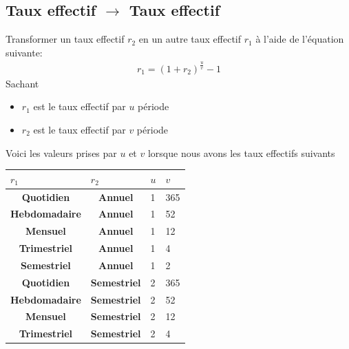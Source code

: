 \documentclass[12pt]{article}
\begin{document}
\subsection{Taux effectif $\rightarrow$ Taux effectif}

Transformer un taux effectif $r_2$ en un autre taux effectif $r_1$ à l'aide de l'équation suivante:
\begin{align*}
r_1 =(1+r_2)^{\frac{u}{v}}-1
\end{align*}
Sachant 
\begin{itemize}
\item $r_1$ est le taux effectif par $u$ période 
\item $r_2$ est le taux effectif par $v$ période 
\end{itemize}
Voici les valeurs prises par $u$ et $v$ lorsque nous avons les taux effectifs suivants 


\begin{table}[H]
\begin{center}
\begin{tabular}{|c|c|l|l|}
\hline
\multicolumn{1}{|l|}{\textbf{$r_1$}} & \multicolumn{1}{l|}{\textbf{$r_2$}} & \textbf{$u$} & \textbf{$v$} \\ \hline
\textbf{Quotidien}                   & \textbf{Annuel}                     & 1            & 365          \\ \hline
\textbf{Hebdomadaire}                & \textbf{Annuel}                     & 1            & 52           \\ \hline
\textbf{Mensuel}                     & \textbf{Annuel}                     & 1            & 12           \\ \hline
\textbf{Trimestriel}                 & \textbf{Annuel}                     & 1            & 4            \\ \hline
\textbf{Semestriel}                  & \textbf{Annuel}                     & 1            & 2            \\ \hline
\textbf{Quotidien}                   & \textbf{Semestriel}                 & 2            & 365          \\ \hline
\textbf{Hebdomadaire}                & \textbf{Semestriel}                 & 2            & 52           \\ \hline
\textbf{Mensuel}                     & \textbf{Semestriel}                 & 2            & 12           \\ \hline
\textbf{Trimestriel}                 & \textbf{Semestriel}                 & 2            & 4            \\ \hline
\end{tabular}
\end{center}
\end{table}
\end{document}
